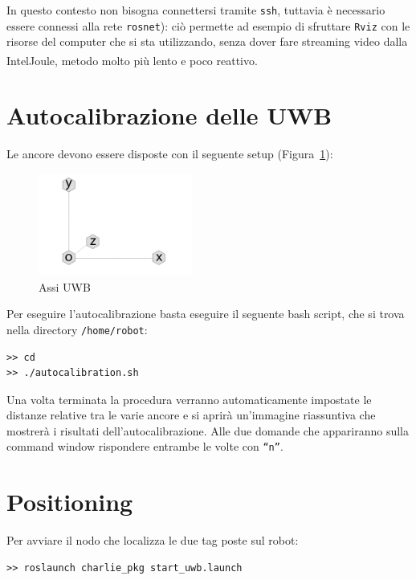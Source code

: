 In questo contesto non bisogna connettersi tramite \verb!ssh!, tuttavia è necessario essere connessi alla rete \verb!rosnet!): ciò permette ad esempio di sfruttare \verb!Rviz! con le risorse del computer che si sta utilizzando, senza dover fare streaming video dalla Intel\textsuperscript\textregistered Joule\texttrademark, metodo molto più lento e poco reattivo.
\section*{Autocalibrazione delle UWB}

Le ancore devono essere disposte con il seguente setup (Figura~\ref{fig:uwb_axis}):

\begin{figure}[h] 
\centering    
\includegraphics[width=0.45\textwidth]{Appendice3/Fig/uwb_axis.png}
\caption[Assi UWB]{Assi UWB}
\label{fig:uwb_axis}
\end{figure}

Per eseguire l’autocalibrazione basta eseguire il seguente bash script, che si trova nella directory \verb!/home/robot!:

\medskip
\begin{tcolorbox}
\begin{verbatim}
>> cd
>> ./autocalibration.sh
\end{verbatim}
\end{tcolorbox}

Una volta terminata la procedura verranno automaticamente impostate le distanze relative tra le varie ancore e si aprirà un’immagine riassuntiva che mostrerà i risultati dell’autocalibrazione. Alle due domande che appariranno sulla command window rispondere entrambe le volte con \verb!“n”!.
\section*{Positioning}

Per avviare il nodo che localizza le due tag poste sul robot:

\medskip
\begin{tcolorbox}
\begin{verbatim}
>> roslaunch charlie_pkg start_uwb.launch
\end{verbatim}
\end{tcolorbox}

